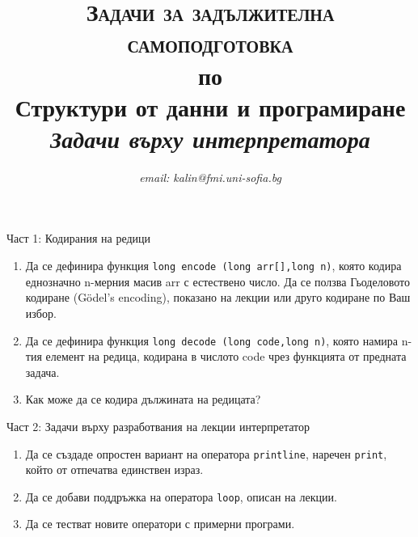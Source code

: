 \documentclass[12pt,a4paper]{article}
\author{\textit{email: kalin@fmi.uni-sofia.bg}}
\title{\textsc{Задачи за задължителна самоподготовка} \\
по \\
Структури от данни и програмиране\\
\textit{Задачи върху интерпретатора}}
\begin{document}
\maketitle

Част 1: Кодирания на редици

\begin{enumerate}
	\item Да се дефинира функция \texttt{long encode (long arr[],long n)}, която кодира еднозначно n-мерния масив arr с естествено число. Да се ползва Гьоделовото кодиране (Gödel's encoding), показано на лекции или друго кодиране по Ваш избор.
	\item Да се дефинира функция \texttt{long decode (long code,long n)}, която намира n-тия елемент на редица, кодирана в числото code чрез функцията от предната задача.
	\item Как може да се кодира дължината на редицата?
\end{enumerate}

Част 2: Задачи върху разработвания на лекции интерпретатор

\begin{enumerate}
	\item Да се създаде опростен вариант на оператора \texttt{printline}, наречен \texttt{print}, който от отпечатва единствен израз.
	\item Да се добави поддръжка на оператора \texttt{loop}, описан на лекции.
	\item Да се тестват новите оператори с примерни програми.
\end{enumerate}
\end{document}
